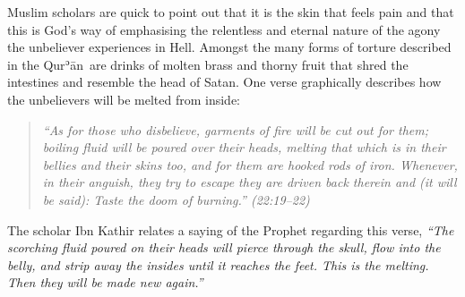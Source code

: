 \documentclass[12pt]{memoir}
\def\´{ʾ} %
\def \Quran{Qur\-\´ān} %
\newcommand{\QRef}[1]{{\color{darkblue}#1}}
\begin{document}
Muslim scholars are quick to point out that it is the skin
that feels pain and that this is God’s way of emphasising the relentless
and eternal nature of the agony the unbeliever experiences in Hell.
Amongst the many forms of torture described in the \Quran\
are drinks of molten brass and thorny fruit that shred
the intestines and resemble the head of Satan.
One verse graphically describes
how the unbelievers will be melted from inside:

\begin{quote}
\itshape
“As for those who disbelieve, garments of fire will be cut out for them;
boiling fluid will be poured over their heads,
melting that which is in their bellies and their skins too,
and for them are hooked rods of iron.
Whenever, in their anguish, they try to escape they are driven back therein
and (it will be said): Taste the doom of burning.”
(\QRef{22:19–22})
\end{quote}

The scholar Ibn Kathir relates a saying of the Prophet regarding this verse,
\emph{“The scorching fluid poured on their heads will pierce through the skull,
flow into the belly, and strip away the insides until it reaches the feet.
This is the melting.
Then they will be made new again.”}
\end{document}
